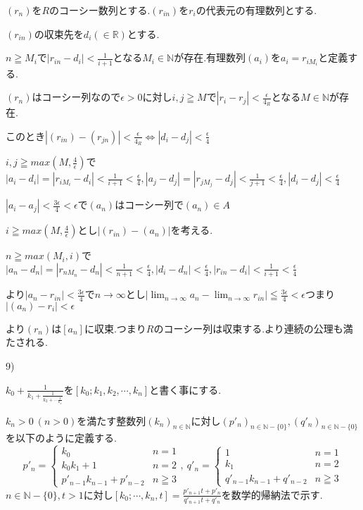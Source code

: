 \documentclass{jsarticle}
\begin{document}
$(r_n)$を$R$のコーシー数列とする.$(r_{in})$を$r_i$の代表元の有理数列とする.

$(r_{in})$の収束先を$d_i(\in\mathbb {R})$とする.

$n\geqq M_i$で$|r_{in} - d_i|<\frac{1}{i+1}$となる$M_i\in\mathbb{N}$が存在.有理数列$(a_i)$を$a_i=r_{iM_i}$と定義する.

$(r_n)$はコーシー列なので$\epsilon > 0$に対し$i,j\geqq M$で$|r_i-r_j| < \frac{\epsilon}{4_R}$となる$M\in\mathbb{N}$が存在.

このとき$|(r_{in})-(r_{jn})|<\frac{\epsilon}{4_R}\Leftrightarrow |d_i-d_j|<\frac{\epsilon}{4}$

$i,j\geqq max(M,\frac{4}{\epsilon})$で$|a_i-d_i|=|r_{iM_i}-d_i|<\frac{1}{i+1}<\frac{\epsilon}{4},|a_j-d_j|=|r_{jM_j}-d_j|<\frac{1}{j+1}<\frac{\epsilon}{4},|d_i-d_j|<\frac{\epsilon}{4}$

$|a_i-a_j|<\frac{3\epsilon}{4}<\epsilon$で$(a_n)$はコーシー列で$(a_n)\in A$

$i\geqq max(M,\frac{4}{\epsilon})$とし$|(r_{in})-(a_n)|$を考える.

$n\geqq max(M_i,i)$で$|a_n-d_n|=|r_{nM_n}-d_n|<\frac{1}{n+1}<\frac{\epsilon}{4},|d_i-d_n|<\frac{\epsilon}{4},|r_{in}-d_i|<\frac{1}{i+1}<\frac{\epsilon}{4}$

より$|a_n-r_{in}|<\frac{3\epsilon}{4}$で$n\to\infty$とし$\displaystyle |\lim_{n\to\infty}a_n - \lim_{n\to\infty} r_{in}| \leqq \frac{3\epsilon}{4}<\epsilon$つまり$|(a_n)-r_i|<\epsilon$

より$(r_n)$は$[a_n]$に収束.つまり$R$のコーシー列は収束する.より連続の公理も満たされる.

9)

$k_0+\frac{1}{k_1+\frac{1}{k_2+\cdots \frac{1}{k_n}}}$を$[k_0;k_1,k_2,\cdots,k_n]$と書く事にする.

$k_n>0 \ (n > 0)$を満たす整数列$(k_n)_{n\in\mathbb{N}}$に対し$(p'_n)_{n\in\mathbb{N}-\{0\}},(q'_n)_{n\in\mathbb{N}-\{0\}}$を以下のように定義する.
\[p'_n=\begin{cases}
k_0 & n=1 \\
k_0k_1+1 & n=2 \\
p'_{n-1}k_{n-1}+p'_{n-2} & n\geqq 3
\end{cases}, \ q'_n=\begin{cases}
1 & n=1 \\
k_1 & n=2 \\
q'_{n-1}k_{n-1}+q'_{n-2} & n\geqq 3
\end{cases}\]
$n\in \mathbb{N}-\{0\},t>1$に対し$[k_0;\cdots ,k_n,t]=\frac{p'_{n+1}t+p'_n}{q'_{n+1}t+q'_n}$を数学的帰納法で示す.
\end{document}
